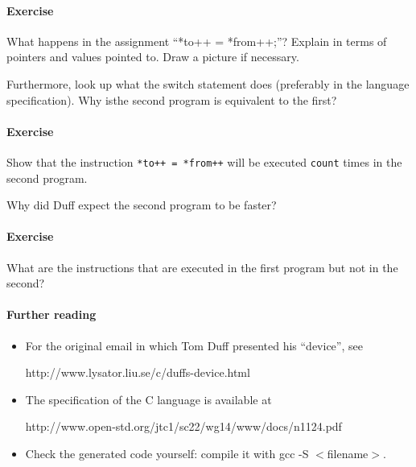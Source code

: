 \documentclass{article}
\newcommand{\percent}[1]{\protect \marginpar[l]{\bf [#1 points]}}
\newcounter{question}
\newenvironment{question}[1]{
  \addtocounter{question}{1}
  \paragraph{Exercise~\arabic{question}  \percent{#1}}
}{
  \vfil
}
\begin{document}

\begin{question}{X}
What happens in the assignment ``\textsf{*to++ = *from++;}''?  Explain in
terms of pointers and values pointed to. Draw a picture if necessary.
\end{question}

Furthermore, look up what
the \textsf{switch} statement does (preferably in the language
specification). Why isthe second program is equivalent to the first?

\begin{question}{X}
Show that the instruction \texttt{*to++ = *from++} will be executed 
\texttt{count} times in the second program.
\end{question}

Why did Duff expect the second program to be faster?

\begin{question}{X}
  What are the instructions that are executed in the first program but
  not in the second?
\end{question}


\paragraph{Further reading}
\begin{itemize}
\item For the original email in which Tom Duff presented his ``device'',
see 

\textsf{http://www.lysator.liu.se/c/duffs-device.html}
\item The specification of the C language is available at 

\textsf{http://www.open-std.org/jtc1/sc22/wg14/www/docs/n1124.pdf}
\item Check the generated code yourself: compile it
with \textsf{gcc -S $<$filename$>$}.
\end{itemize}

\vfill
\end{document}
